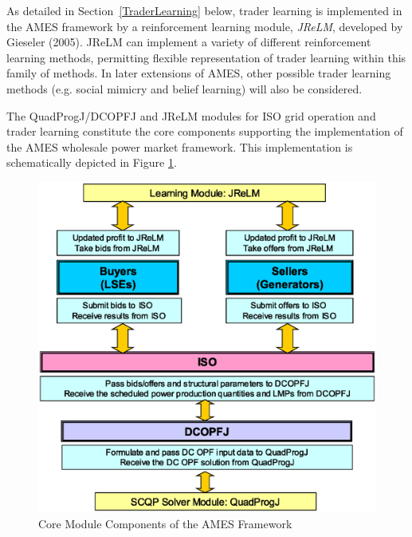 \documentclass[12pt]{article}
\begin{document}
As detailed in Section~\ref{TraderLearning} below, trader learning is implemented in the AMES framework by a reinforcement learning module, \textit{JReLM\/}, developed by Gieseler (2005).  JReLM can implement a variety of different reinforcement learning methods, permitting flexible representation of trader learning within this family of methods.  In later extensions of AMES, other possible trader learning methods (e.g. social mimicry and belief learning) will also be considered.

The QuadProgJ/DCOPFJ and JReLM modules for ISO grid operation and trader learning constitute the core components supporting the implementation of the AMES wholesale power market framework.  This implementation is schematically depicted in Figure \ref{fig:AMES.MainComponents}.

\begin{figure}
	\centering
		\includegraphics[totalheight = 9cm]{AMES.MainComponents.eps}
	\caption{Core Module Components of the AMES Framework}
	\label{fig:AMES.MainComponents}
\end{figure} 



\end{document}
